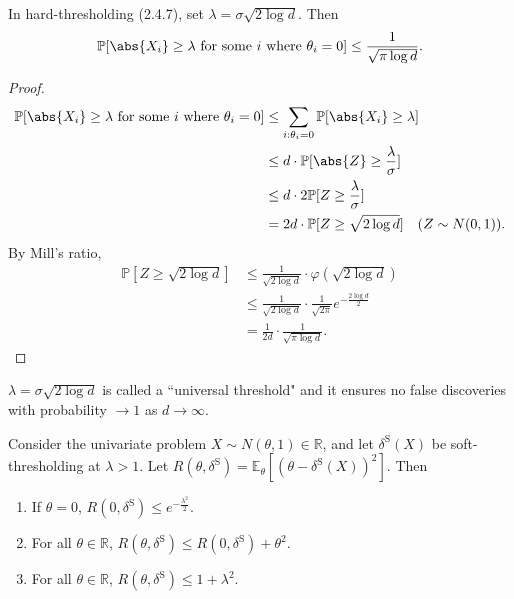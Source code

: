 \documentclass[a4paper]{article}
\begin{document}
\begin{cor}
	In hard-thresholding (2.4.7), set $\lambda = \sigma \sqrt{2\log d}.$ Then
	\begin{equation}
		\mathbb{P}[\abs{X_i} \geq \lambda \text{ for some $i$ where $\theta_i = 0$}] \leq \frac{1}{\sqrt{\pi \log d}}.
	\end{equation}
\end{cor}

\begin{proof}
	\begin{equation*}
		\begin{aligned}
			\mathbb{P}[\abs{X_i} \geq \lambda \text{ for some $i$ where $\theta_i = 0$}] &\leq \sum\limits_{i: \theta_i = 0} \mathbb{P}[\abs{X_i} \geq \lambda] \\
			& \leq d \cdot \mathbb{P}[\abs{Z} \geq \frac{\lambda}{\sigma}] \\
			& \leq d \cdot 2 \mathbb{P}[Z \geq \frac{\lambda}{\sigma}] \\
			&= 2d \cdot \mathbb{P}[Z \geq \sqrt{2\log d}] \quad (Z \sim N(0,1)).
		\end{aligned}
	\end{equation*}
	By Mill's ratio,
	\begin{equation}
		\begin{aligned}
			\mathbb{P}[Z \geq \sqrt{2\log d}] &\leq \frac{1}{\sqrt{2\log d}} \cdot \varphi(\sqrt{2\log d}) \\
			&\leq \frac{1}{\sqrt{2\log d}} \cdot \frac{1}{\sqrt{2\pi}}e^{-\frac{2\log d}{2}} \\
			&= \frac{1}{2d} \cdot \frac{1}{\sqrt{\pi\log d}}.
		\end{aligned}
	\end{equation}
\end{proof}

\begin{remark}
	$\lambda = \sigma\sqrt{2\log d}$ is called a ``universal threshold" and it ensures no false discoveries with probability $\to 1$ as $d \to \infty$.
\end{remark}

\begin{lemma}
	Consider the univariate problem $X \sim N(\theta,1) \in \mathbb{R}$, and let $\delta^{\text{S}}(X)$ be soft-thresholding at $\lambda > 1$. Let $R(\theta,\delta^{\text{S}}) = \mathbb{E}_\theta[(\theta-\delta^{\text{S}}(X))^2]$. Then
	\begin{enumerate}
		\item If $\theta = 0$, $R(0,\delta^{\text{S}}) \leq e^{-\frac{\lambda^2}{2}}$.
		\item For all $\theta \in \mathbb{R}$, $R(\theta,\delta^{\text{S}}) \leq R(0,\delta^{\text{S}}) + \theta^2$.
		\item For all $\theta \in \mathbb{R}$, $R(\theta,\delta^{\text{S}}) \leq 1 + \lambda^2$.
	\end{enumerate}
\end{lemma}
\end{document}
